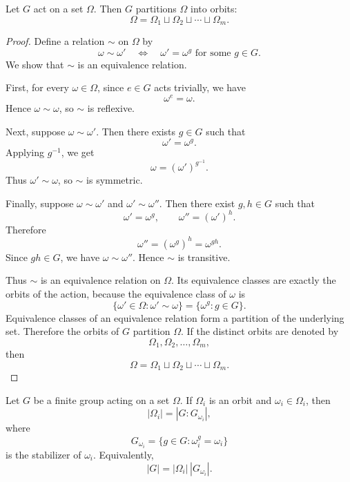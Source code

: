 \begin{proposition}
Let $G$ act on a set $\Omega$. Then $G$ partitions $\Omega$ into orbits:
\[
    \Omega=\Omega_1\sqcup\Omega_2\sqcup\cdots\sqcup\Omega_m.
\]
\end{proposition}

\begin{proof}
    Define a relation \(\sim\) on \(\Omega\) by
    \[
        \omega\sim \omega'
        \quad\Longleftrightarrow\quad
        \omega'=\omega^g
        \text{ for some } g\in G.
    \]
    We show that \(\sim\) is an equivalence relation.
    
    First, for every \(\omega\in\Omega\), since \(e\in G\) acts trivially, we have
    \[
        \omega^e=\omega.
    \]
    Hence \(\omega\sim\omega\), so \(\sim\) is reflexive.
    
    Next, suppose \(\omega\sim\omega'\). Then there exists \(g\in G\) such that
    \[
        \omega'=\omega^g.
    \]
    Applying \(g^{-1}\), we get
    \[
        \omega
        =
        (\omega')^{g^{-1}}.
    \]
    Thus \(\omega'\sim\omega\), so \(\sim\) is symmetric.
    
    Finally, suppose \(\omega\sim\omega'\) and \(\omega'\sim\omega''\). Then there exist
    \(g,h\in G\) such that
    \[
        \omega'=\omega^g,
        \qquad
        \omega''=(\omega')^h.
    \]
    Therefore
    \[
        \omega''
        =
        (\omega^g)^h
        =
        \omega^{gh}.
    \]
    Since \(gh\in G\), we have \(\omega\sim\omega''\). Hence \(\sim\) is transitive.
    
    Thus \(\sim\) is an equivalence relation on \(\Omega\). Its equivalence classes are exactly
    the orbits of the action, because the equivalence class of \(\omega\) is
    \[
        \{\omega'\in\Omega:\omega'\sim\omega\}
        =
        \{\omega^g:g\in G\}.
    \]
    Equivalence classes of an equivalence relation form a partition of the underlying set.
    Therefore the orbits of \(G\) partition \(\Omega\). If the distinct orbits are denoted by
    \[
        \Omega_1,\Omega_2,\ldots,\Omega_m,
    \]
    then
    \[
        \Omega=\Omega_1\sqcup\Omega_2\sqcup\cdots\sqcup\Omega_m.
    \]
    \end{proof}

\begin{theorem}\label{thm:orbit-stabilizer}
Let $G$ be a finite group acting on a set $\Omega$. If $\Omega_i$ is an orbit and
$\omega_i\in\Omega_i$, then
\[
    |\Omega_i|=|G:G_{\omega_i}|,
\]
where
\[
    G_{\omega_i}
    =
    \{g\in G:\omega_i^g=\omega_i\}
\]
is the stabilizer of $\omega_i$. Equivalently,
\[
    |G|=|\Omega_i|\,|G_{\omega_i}|.
\]
\end{theorem}

